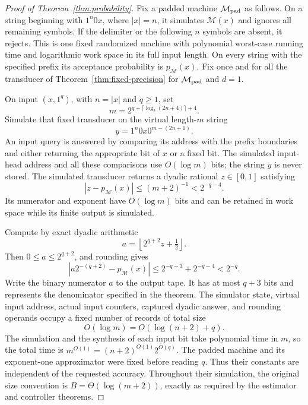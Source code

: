 \begin{proof}[Proof of Theorem~\ref{thm:probability}]
Fix a padded machine $\mathcal M_{\rm pad}$ as follows. On a string
beginning with $1^n0x$, where $|x|=n$, it simulates $\mathcal M(x)$
and ignores all remaining symbols. If the delimiter or the following
$n$ symbols are absent, it rejects. This is one fixed randomized
machine with polynomial worst-case running time and logarithmic work
space in its full input length. On every string with the specified
prefix its acceptance probability is $p_{\mathcal M}(x)$.
Fix once and for all the transducer of
Theorem~\ref{thm:fixed-precision} for $\mathcal M_{\rm pad}$ and $d=1$.

On input $(x,1^q)$, with $n=|x|$ and $q\ge1$, set
\[
 m=2^{q+\lceil\log_2(2n+4)\rceil+4}.
\]
Simulate that fixed transducer on the virtual length-$m$ string
\[
 y=1^n0x0^{m-(2n+1)}.
\]
An input query is answered by comparing its address with the prefix
boundaries and either returning the appropriate bit of $x$ or a
fixed bit. The simulated input-head address and all these comparisons
use $O(\log m)$ bits; the string $y$ is never stored. The simulated
transducer returns a dyadic rational $z\in[0,1]$ satisfying
\[
 |z-p_{\mathcal M}(x)|\le(m+2)^{-1}<2^{-q-4}.
\]
Its numerator and exponent have $O(\log m)$ bits and can be retained
in work space while its finite output is simulated.

Compute by exact dyadic arithmetic
\[
 a=\left\lfloor 2^{q+2}z+\tfrac12\right\rfloor.
\]
Then $0\le a\le2^{q+2}$, and rounding gives
\[
 \left|a2^{-(q+2)}-p_{\mathcal M}(x)\right|
 \le2^{-q-3}+2^{-q-4}<2^{-q}.
\]
Write the binary numerator $a$ to the output tape. It has at most
$q+3$ bits and represents the denominator specified in the theorem.
The simulator state, virtual input address, actual input counters,
captured dyadic answer, and rounding operands occupy a fixed number
of records of total size
\[
 O(\log m)=O(\log(n+2)+q).
\]
The simulation and the synthesis of each input bit take polynomial
time in $m$, so the total time is
$m^{O(1)}=(n+2)^{O(1)}2^{O(q)}$.
The padded machine and its exponent-one approximator were fixed
before reading $q$. Thus their constants are independent of the
requested accuracy. Throughout their simulation, the original size
convention is $B=\Theta(\log(m+2))$, exactly as required by the
estimator and controller theorems.
\end{proof}

